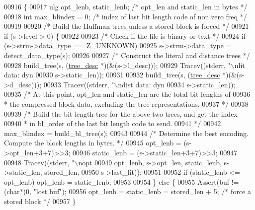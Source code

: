 \begin{DoxyCode}
{{{{{{{{{{{{{{{{{{00916 \{
00917     ulg opt\_lenb, static\_lenb; \textcolor{comment}{/* opt\_len and static\_len in bytes */}
00918     \textcolor{keywordtype}{int} max\_blindex = 0;  \textcolor{comment}{/* index of last bit length code of non zero freq */}
00919 
00920     \textcolor{comment}{/* Build the Huffman trees unless a stored block is forced */}
00921     \textcolor{keywordflow}{if} (s->level > 0) \{
00922 
00923         \textcolor{comment}{/* Check if the file is binary or text */}
00924         \textcolor{keywordflow}{if} (s->strm->data\_type == Z\_UNKNOWN)
00925             s->strm->data\_type = detect\_data\_type(s);
00926 
00927         \textcolor{comment}{/* Construct the literal and distance trees */}
00928         build\_tree(s, (\hyperlink{structtree__desc__s}{tree\_desc} *)(&(s->l\_desc)));
00929         Tracev((stderr, \textcolor{stringliteral}{"\(\backslash\)nlit data: dyn %
00930                 s->static\_len));
00931 
00932         build\_tree(s, (\hyperlink{structtree__desc__s}{tree\_desc} *)(&(s->d\_desc)));
00933         Tracev((stderr, \textcolor{stringliteral}{"\(\backslash\)ndist data: dyn %
00934                 s->static\_len));
00935         \textcolor{comment}{/* At this point, opt\_len and static\_len are the total bit lengths of}
00936 \textcolor{comment}{         * the compressed block data, excluding the tree representations.}
00937 \textcolor{comment}{         */}
00938 
00939         \textcolor{comment}{/* Build the bit length tree for the above two trees, and get the index}
00940 \textcolor{comment}{         * in bl\_order of the last bit length code to send.}
00941 \textcolor{comment}{         */}
00942         max\_blindex = build\_bl\_tree(s);
00943 
00944         \textcolor{comment}{/* Determine the best encoding. Compute the block lengths in bytes. */}
00945         opt\_lenb = (s->opt\_len+3+7)>>3;
00946         static\_lenb = (s->static\_len+3+7)>>3;
00947 
00948         Tracev((stderr, \textcolor{stringliteral}{"\(\backslash\)nopt %
00949                 opt\_lenb, s->opt\_len, static\_lenb, s->static\_len, stored\_len,
00950                 s->last\_lit));
00951 
00952         \textcolor{keywordflow}{if} (static\_lenb <= opt\_lenb) opt\_lenb = static\_lenb;
00953 
00954     \} \textcolor{keywordflow}{else} \{
00955         Assert(buf != (\textcolor{keywordtype}{char}*)0, \textcolor{stringliteral}{"lost buf"});
00956         opt\_lenb = static\_lenb = stored\_len + 5; \textcolor{comment}{/* force a stored block */}
00957     \}
}}}}}}}}}}}}}}}}}}}}}
\end{DoxyCode}
